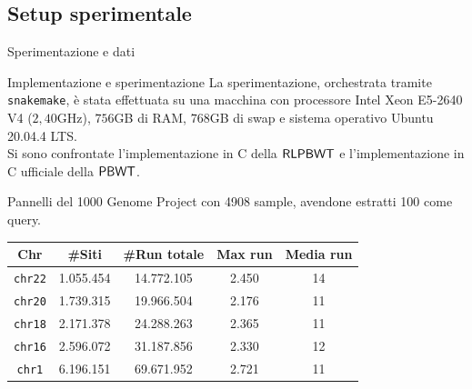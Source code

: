 \documentclass[]{beamer}
\def\PBWT{\mbox{\rm {\sf PBWT}}}
\def\RLPBWT{\mbox{\rm {\sf RLPBWT}}}
\def\Cplusplus{C\raisebox{0.5ex}{\tiny\textbf{++}}}
\begin{document}
\subsection{Setup sperimentale}
\begin{frame}{Sperimentazione e dati}
   \begin{block}{Implementazione e sperimentazione}
    \small
    La sperimentazione, orchestrata tramite \texttt{snakemake}, è stata
    effettuata su una macchina con processore 
    Intel Xeon E5-2640 V4 ($2,40$GHz), $756$GB di RAM, $768$GB di swap e
    sistema operativo Ubuntu 20.04.4 LTS.\\
    Si sono confrontate l'implementazione in \Cplusplus $\,\,$della $\RLPBWT$ e
    l'implementazione in C ufficiale della $\PBWT$.
  \end{block}
  \begin{block}{Pannelli del 1000 Genome Project con 4908 sample,
        avendone 
      estratti 100 come query.} 
    \begin{table}
      \footnotesize
      \centering
      \begin{tabular}{c||c|c|c|c}
        \textbf{Chr} & \textbf{\#Siti} & \textbf{\#Run totale}
        & \textbf{Max run} & \textbf{Media run} \\ 
        \hline
        \texttt{chr22} & 1.055.454 & 14.772.105 & 2.450 & 14\\
        \texttt{chr20} & 1.739.315 & 19.966.504 & 2.176 & 11\\
        \texttt{chr18} & 2.171.378 & 24.288.263 & 2.365 & 11\\
        \texttt{chr16} & 2.596.072 & 31.187.856 & 2.330 & 12\\
        \texttt{chr1} & 6.196.151 & 69.671.952 & 2.721 & 11\\
      \end{tabular}
    \end{table}
  \end{block}
\end{frame}
\end{document}
